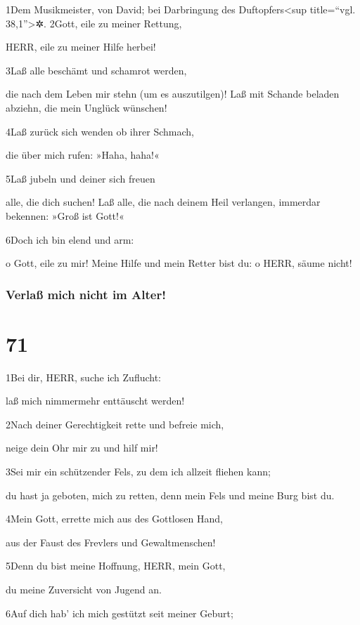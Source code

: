 1Dem Musikmeister, von David; bei Darbringung des
Duftopfers\textless sup title=``vgl. 38,1''\textgreater✲. 2Gott, eile zu
meiner Rettung,

HERR, eile zu meiner Hilfe herbei!

3Laß alle beschämt und schamrot werden,

die nach dem Leben mir stehn (um es auszutilgen)! Laß mit Schande
beladen abziehn, die mein Unglück wünschen!

4Laß zurück sich wenden ob ihrer Schmach,

die über mich rufen: »Haha, haha!«

5Laß jubeln und deiner sich freuen

alle, die dich suchen! Laß alle, die nach deinem Heil verlangen,
immerdar bekennen: »Groß ist Gott!«

6Doch ich bin elend und arm:

o Gott, eile zu mir! Meine Hilfe und mein Retter bist du: o HERR, säume
nicht!

\hypertarget{verlauxdf-mich-nicht-im-alter}{%
\subsubsection{Verlaß mich nicht im
Alter!}\label{verlauxdf-mich-nicht-im-alter}}

\hypertarget{section-70}{%
\section{71}\label{section-70}}

1Bei dir, HERR, suche ich Zuflucht:

laß mich nimmermehr enttäuscht werden!

2Nach deiner Gerechtigkeit rette und befreie mich,

neige dein Ohr mir zu und hilf mir!

3Sei mir ein schützender Fels, zu dem ich allzeit fliehen kann;

du hast ja geboten, mich zu retten, denn mein Fels und meine Burg bist
du.

4Mein Gott, errette mich aus des Gottlosen Hand,

aus der Faust des Frevlers und Gewaltmenschen!

5Denn du bist meine Hoffnung, HERR, mein Gott,

du meine Zuversicht von Jugend an.

6Auf dich hab' ich mich gestützt seit meiner Geburt;

